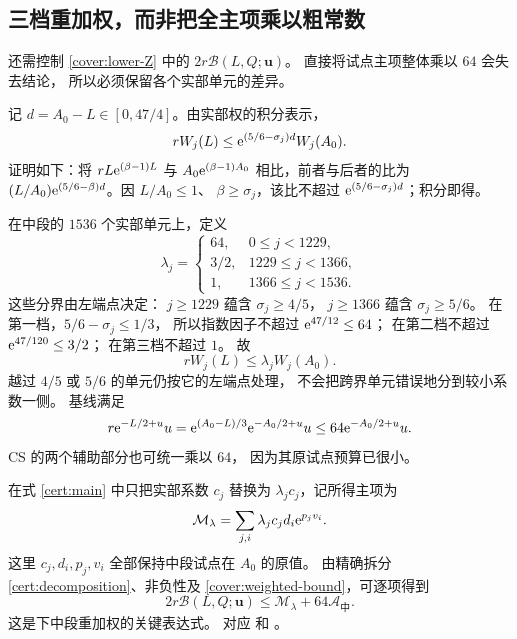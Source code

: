 \subsection{三档重加权，而非把全主项乘以粗常数}

还需控制 \eqref{cover:lower-Z} 中的
$2r\mathcal B(L,Q;\boldsymbol u)$。
直接将试点主项整体乘以 $64$ 会失去结论，
所以必须保留各个实部单元的差异。

记 $d=A_0-L\in[0,47/4]$。由实部权的积分表示，
\begin{equation}\label{cover:weight-down}
 rW_j(L)\leq
       \mathrm e^{(5/6-\sigma_j)d}W_j(A_0).
\end{equation}
证明如下：将 $rL\mathrm e^{(\beta-1)L}$ 与
$A_0\mathrm e^{(\beta-1)A_0}$ 相比，前者与后者的比为
$(L/A_0)\mathrm e^{(5/6-\beta)d}$。因 $L/A_0\leq1$、
$\beta\geq\sigma_j$，该比不超过
$\mathrm e^{(5/6-\sigma_j)d}$；积分即得。

在中段的 $1536$ 个实部单元上，定义
\begin{equation}\label{cover:multiplier}
 \lambda_j=
 \begin{cases}
 64,&0\leq j<1229,\\
 3/2,&1229\leq j<1366,\\
 1,&1366\leq j<1536.
 \end{cases}
\end{equation}
这些分界由左端点决定：
$j\geq1229$ 蕴含 $\sigma_j\geq4/5$，
$j\geq1366$ 蕴含 $\sigma_j\geq5/6$。
在第一档，$5/6-\sigma_j\leq1/3$，
所以指数因子不超过 $\mathrm e^{47/12}\leq64$；
在第二档不超过 $\mathrm e^{47/120}\leq3/2$；
在第三档不超过 $1$。
故
\begin{equation}\label{cover:weighted-bound}
 rW_j(L)\leq\lambda_jW_j(A_0).
\end{equation}
越过 $4/5$ 或 $5/6$ 的单元仍按它的左端点处理，
不会把跨界单元错误地分到较小系数一侧。
基线满足
\[
 r\mathrm e^{-L/2+u}u
  =\mathrm e^{(A_0-L)/3}\mathrm e^{-A_0/2+u}u
  \leq64\mathrm e^{-A_0/2+u}u.
\]
CS 的两个辅助部分也可统一乘以 $64$，
因为其原试点预算已很小。

在式 \eqref{cert:main} 中只把实部系数 $c_j$
替换为 $\lambda_jc_j$，记所得主项为
\begin{equation}\label{cover:weighted-main}
 \mathcal M_{\lambda}
   =\sum_{j,i}\lambda_jc_jd_i\mathrm e^{p_jv_i}.
\end{equation}
这里 $c_j,d_i,p_j,v_i$ 全部保持中段试点在 $A_0$ 的原值。
由精确拆分 \eqref{cert:decomposition}、非负性及
\eqref{cover:weighted-bound}，可逐项得到
\begin{equation}\label{cover:scaled-B}
 2r\mathcal B(L,Q;\boldsymbol u)
     \leq\mathcal M_\lambda+64\mathcal A_{\text{中}}.
\end{equation}
这是下中段重加权的关键表达式。
对应 
和 。

